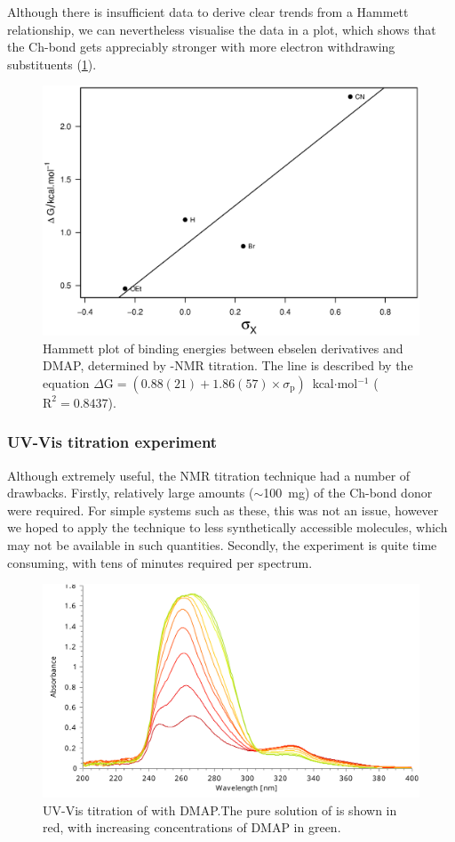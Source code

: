 \begin{refsection}
Although there is insufficient data to derive clear trends from a Hammett relationship, we can nevertheless visualise the data in a plot, which shows that the Ch-bond gets appreciably stronger with more electron withdrawing substituents (\cref{fig:hammett-dmap-nmr}).

\begin{figure}
    \centering
    \includegraphics[width=0.75\linewidth]{Figures/hammett-dmap-nmr.eps}
    \caption[Hammett plot of binding energies between ebselen derivatives and DMAP.]{Hammett plot of binding energies between ebselen derivatives and DMAP, determined by -NMR titration. The line is described by the equation $\Delta\mathrm{G} = (0.88(21) + 1.86(57) \times \sigma_\text{p})$~kcal$ \cdot $mol$^{-1}$ ($\mathrm{R}^2 = 0.8437$).}\label{fig:hammett-dmap-nmr}
\end{figure}


\subsubsection{UV-Vis titration experiment}
Although extremely useful, the NMR titration technique had a number of drawbacks.
Firstly, relatively large amounts ($\sim$100~mg) of the Ch-bond donor were required.
For simple systems such as these, this was not an issue, however we hoped to apply the technique to less synthetically accessible molecules, which may not be available in such quantities.
Secondly, the experiment is quite time consuming, with tens of minutes required per spectrum.

\begin{figure}
  \includegraphics[width=0.7\linewidth]{Figures/ebs-dmap-uv-titration.pdf}
  \caption[UV-Vis titration of  with DMAP.]{UV-Vis titration of  with DMAP.\@ The pure solution of  is shown in red, with increasing concentrations of DMAP in green.}\label{fig:ebs-dmap-uv-titration}
\end{figure}


\end{refsection}
